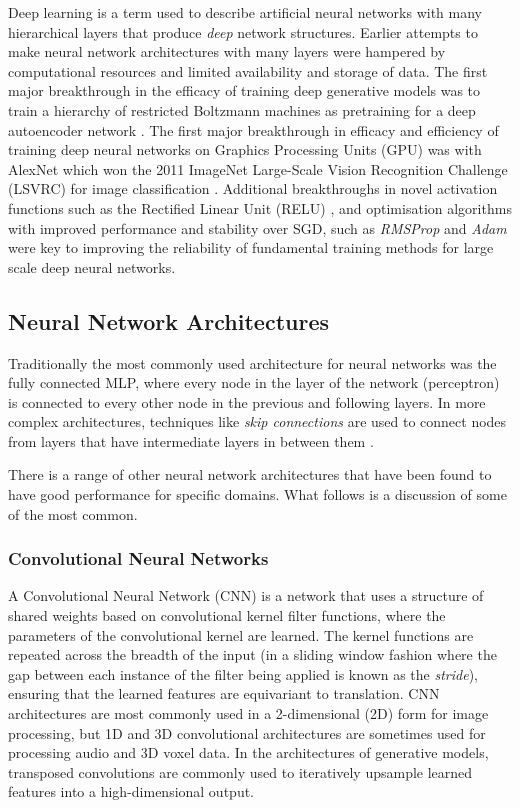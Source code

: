 Deep learning is a term used to describe artificial neural networks with many hierarchical layers that produce \textit{deep} network structures. 
Earlier attempts to make neural network architectures with many layers were hampered by computational resources and limited availability and storage of data. 
The first major breakthrough in the efficacy of training deep generative models was to train a hierarchy of restricted Boltzmann machines \citep{ackley1985learning} as pretraining for a deep autoencoder network \citep{hinton2006reducing}. 
The first major breakthrough in efficacy and efficiency of training deep neural networks on Graphics Processing Units (GPU) was with AlexNet \citep{krizhevsky2012imagenet} which won the 2011 ImageNet Large-Scale Vision Recognition Challenge (LSVRC) for image classification \citep{russakovsky2015imagenet}. 
Additional breakthroughs in novel activation functions such as the Rectified Linear Unit (RELU) \citep{nair2010rectified}, and optimisation algorithms with improved performance and stability over SGD, such as \textit{RMSProp} \citep{tieleman2012lecture} and \textit{Adam} \citep{kingma2015adam} were key to improving the reliability of fundamental training methods for large scale deep neural networks.


\subsection{Neural Network Architectures}

Traditionally the most commonly used architecture for neural networks was the fully connected MLP, where every node in the layer of the network (perceptron) is connected to every other node in the previous and following layers. 
In more complex architectures, techniques like \textit{skip connections} are used to connect nodes from layers that have intermediate layers in between them \citep{raiko2012deep,graves2013generating,hermans2013training} . 

There is a range of other neural network architectures that have been found to have good performance for specific domains. 
What follows is a discussion of some of the most common.

\subsubsection{Convolutional Neural Networks}

A Convolutional Neural Network (CNN) \citep{fukushima1982neocognitron} is a network that uses a structure of shared weights based on convolutional kernel filter functions, where the parameters of the convolutional kernel are learned. 
The kernel functions are repeated across the breadth of the input (in a sliding window fashion where the gap between each instance of the filter being applied is known as the \textit{stride}), ensuring that the learned features are equivariant to translation. 
CNN architectures are most commonly used in a 2-dimensional (2D) form for image processing, but 1D and 3D convolutional architectures are sometimes used for processing audio and 3D voxel data. 
In the architectures of generative models, transposed convolutions are commonly used to iteratively upsample learned features into a high-dimensional output.

